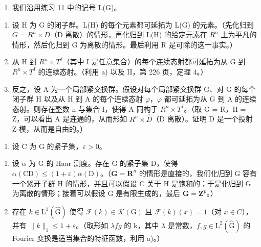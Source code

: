 \begin{enumerate}
\def\labelenumi{\arabic{enumi})}
\setcounter{enumi}{11}
\tightlist
\item
  我们沿用练习 11 中的记号 L(G)。
\end{enumerate}

\begin{enumerate}
\def\labelenumi{\alph{enumi})}
\item
  设 H 为 G 的闭子群。L(H) 的每个元素都可延拓为 L(G) 的元素。（先化归到 \(G = R^{n} \times D\)（D 离散）的情形，再化归到 L(H) 的给定元素在 \(R^{n}\) 上为平凡的情形，然后化归到 G 为离散的情形。最后利用 R 是可除的这一事实。）
\item
  从 H 到 \(R^{n} \times T^{I}\)（其中 I 是任意集合）的每个连续态射都可延拓为从 G 到 \(R^{n} \times T^{I}\) 的连续态射。（利用 a) 以及 II，第 226 页，定理 4。）
\item
  反之，设 A 为一个局部紧交换群。假设对每个局部紧交换群 G、对 G 的每个闭子群 H 以及从 H 到 A 的每个连续态射 \(\varphi\)，\(\varphi\) 都可延拓为从 G 到 A 的连续态射。则存在整数 n 与集合 I，使得 A 同构于 \(R^{n} \times T^{I}\)。（取 G = R，H = Z，可以看出 A 是连通的，从而形如 \(R^{n} \times \widehat{D}\)（D 离散）。证明 D 是一个投射 Z-模，从而是自由的。）
\end{enumerate}

\begin{enumerate}
\def\labelenumi{\arabic{enumi})}
\setcounter{enumi}{12}
\tightlist
\item
  设 C 为 G 的紧子集，\(\varepsilon > 0\)。
\end{enumerate}

\begin{enumerate}
\def\labelenumi{\alph{enumi})}
\item
  设 \(\alpha\) 为 G 的 Haar 测度。存在 G 的紧子集 D，使得 \(\alpha(\mathrm{CD}) \leqslant (1 + \varepsilon)\alpha(\mathrm{D})\)。（\(\mathbf{G} = \mathbf{R}^n\) 的情形是直接的，我们化归到 G 容有一个紧开子群 H 的情形，并且可以假设 C 关于 H 是饱和的；于是化归到 G 为离散的情形；接着可以假设 G 是有限生成的，最后 \(\mathbf{G} = \mathbf{Z}^p\)。）
\item
  存在 \(k \in \mathrm{L}^{1}(\widehat{\mathrm{G}})\) 使得 \(\mathcal{F}(k) \in \mathcal{K}(\mathrm{G})\) 且 \(\mathcal{F}(k)(x) = 1\)（对 \(x \in C\)），并有 \(\|k\|_{1} \leqslant 1 + \varepsilon\)。（取形如 \(\lambda fg\) 的 k，其中 \(\lambda\) 是常数，\(f, g \in \mathrm{L}^{2}(\widehat{\mathrm{G}})\) 的 Fourier 变换是适当集合的特征函数，利用 a)。）
\end{enumerate}

